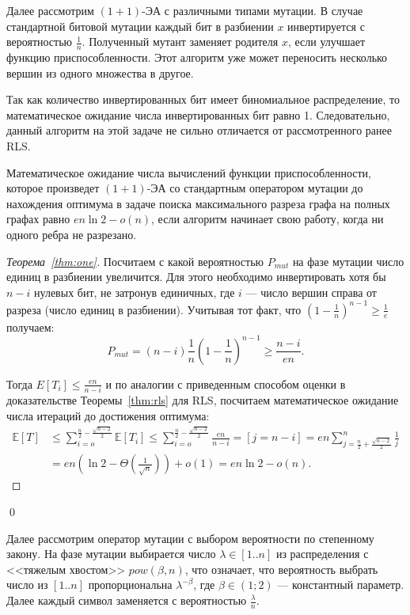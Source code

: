 \documentclass[times]{itmo-student-thesis}
\newcommand{\oea}{\mbox{$(1 + 1)$-ЭА}\xspace}
\begin{document}
Далее рассмотрим \oea с различными типами мутации. В случае стандартной битовой мутации каждый бит в разбиении $x$ инвертируется с вероятностью $\frac{1}{n}$.
Полученный мутант заменяет родителя $x$, если улучшает функцию приспособленности.
Этот алгоритм уже может переносить несколько вершин из одного множества в другое.

Так как количество инвертированных бит имеет биномиальное распределение, то математическое ожидание числа инвертированных бит равно 1.
Следовательно, данный алгоритм на этой задаче не сильно отличается от рассмотренного ранее RLS.

\begin{theorem} \label{thm:one}
  Математическое ожидание числа вычислений функции приспособленности, которое произведет \oea со стандартным оператором мутации до нахождения оптимума в задаче поиска максимального разреза графа на полных графах равно $en\ln 2 - o(n)$, если алгоритм начинает свою работу, когда ни одного ребра не разрезано.
\end{theorem}

\begin{proof}[Теорема~\ref{thm:one}]
Посчитаем с какой вероятностью $P_{mut}$ на фазе мутации число единиц в разбиении увеличится. Для этого необходимо инвертировать хотя бы $n - i$ нулевых бит, не затронув единичных, где $i$ --- число вершин справа от разреза (число единиц в разбиении).
Учитывая тот факт, что
$ (1 - \frac{1}{n})^{n-1} \ge \frac{1}{e}$
получаем:
$$
  P_{mut} = (n-i)\frac{1}{n}\left(1 - \frac{1}{n}\right)^{n-1} \ge \frac{n-i}{en}.
$$

Тогда $E[T_i] \leq \frac{en}{n-i}$ и по аналогии с приведенным способом оценки в доказательстве Теоремы~\ref{thm:rls} для RLS, посчитаем математическое ожидание числа итераций до достижения оптимума:
\begin{align*}
  \mathbb{E}[T] &\le
              \sum_{i=o}^{\frac{n}{2} - \frac{\sqrt{n-2}}{2}} \mathbb{E}[T_i] \leq
              \sum_{i=o}^{\frac{n}{2} - \frac{\sqrt{n-2}}{2}} \frac{en}{n-i} = [j = n - i] = en \sum_{j=\frac{n}{2} + \frac{\sqrt{n-2}}{2}}^{n} \frac{1}{j}  \\
      &=
              en\left(\ln2 - \Theta\left(\frac{1}{\sqrt{n}}\right)\right) + o(1) = en \ln2 - o(n).
\end{align*}
\end{proof}\qed


Далее рассмотрим оператор мутации с выбором вероятности по степенному закону. На фазе мутации выбирается число $\lambda \in [1..n]$ из распределения с <<тяжелым хвостом>> $pow(\beta, n)$, что означает, что  вероятность выбрать число из $[1..n]$ пропорциональна $\lambda^{-\beta}$, где $\beta \in (1; 2)$ --- константный параметр.
Далее каждый символ заменяется с вероятностью $\frac{\lambda}{n}$.
\end{document}
